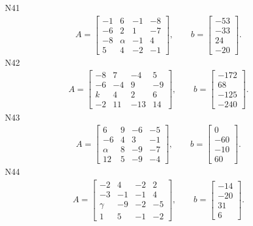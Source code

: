 \documentclass[11pt]{report}
\begin{document}
N41
\begin{align*}
 A = \left[\begin{matrix}-1 & 6 & -1 & -8\\-6 & 2 & 1 & -7\\-8 & \alpha & -1 & 4\\5 & 4 & -2 & -1\end{matrix}\right],
\qquad b = \left[\begin{matrix}-53\\-33\\24\\-20\end{matrix}\right]. 
 \end{align*}
N42
\begin{align*}
 A = \left[\begin{matrix}-8 & 7 & -4 & 5\\-6 & -4 & 9 & -9\\k & 4 & 2 & 6\\-2 & 11 & -13 & 14\end{matrix}\right],
\qquad b = \left[\begin{matrix}-172\\68\\-125\\-240\end{matrix}\right]. 
 \end{align*}
N43
\begin{align*}
 A = \left[\begin{matrix}6 & 9 & -6 & -5\\-6 & 4 & 3 & -1\\\alpha & 8 & -9 & -7\\12 & 5 & -9 & -4\end{matrix}\right],
\qquad b = \left[\begin{matrix}0\\-60\\-10\\60\end{matrix}\right]. 
 \end{align*}
N44
\begin{align*}
 A = \left[\begin{matrix}-2 & 4 & -2 & 2\\-3 & -1 & -1 & 4\\\gamma & -9 & -2 & -5\\1 & 5 & -1 & -2\end{matrix}\right],
\qquad b = \left[\begin{matrix}-14\\-20\\31\\6\end{matrix}\right]. 
 \end{align*}
\end{document}
